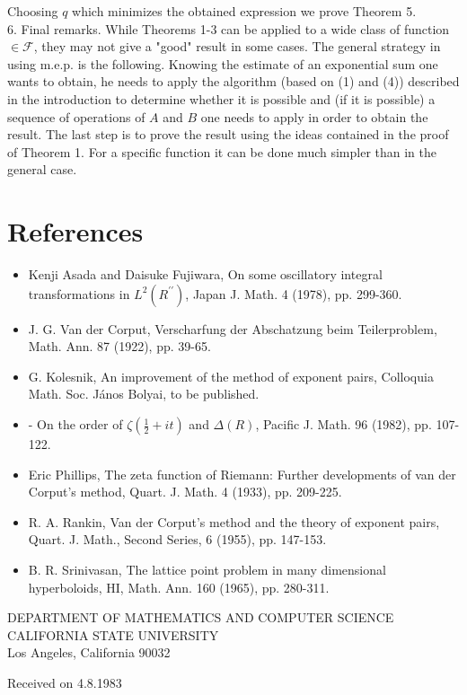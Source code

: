 \documentclass[10pt]{article}
\begin{document}
Choosing $q$ which minimizes the obtained expression we prove Theorem 5.\\
6. Final remarks. While Theorems 1-3 can be applied to a wide class of function $\in \mathscr{F}$, they may not give a "good" result in some cases. The general strategy in using m.e.p. is the following. Knowing the estimate of an exponential sum one wants to obtain, he needs to apply the algorithm (based on (1) and (4)) described in the introduction to determine whether it is possible and (if it is possible) a sequence of operations of $A$ and $B$ one needs to apply in order to obtain the result. The last step is to prove the result using the ideas contained in the proof of Theorem 1. For a specific function it can be done much simpler than in the general case.

\section*{References}
\begin{itemize}
  \item[] [1] Kenji Asada and Daisuke Fujiwara, On some oscillatory integral transformations in $L^{2}\left(R^{\prime \prime}\right)$, Japan J. Math. 4 (1978), pp. 299-360.
  \item[] [2] J. G. Van der Corput, Verscharfung der Abschatzung beim Teilerproblem, Math. Ann. 87 (1922), pp. 39-65.
  \item[] [3] G. Kolesnik, An improvement of the method of exponent pairs, Colloquia Math. Soc. János Bolyai, to be published.
  \item[] [4] - On the order of $\zeta\left(\frac{1}{2}+i t\right)$ and $\Delta(R)$, Pacific J. Math. 96 (1982), pp. 107-122.
  \item[] [5] Eric Phillips, The zeta function of Riemann: Further developments of van der Corput's method, Quart. J. Math. 4 (1933), pp. 209-225.
  \item[] [6] R. A. Rankin, Van der Corput's method and the theory of exponent pairs, Quart. J. Math., Second Series, 6 (1955), pp. 147-153.
  \item[] [7] B. R. Srinivasan, The lattice point problem in many dimensional hyperboloids, HI, Math. Ann. 160 (1965), pp. 280-311.
\end{itemize}

DEPARTMENT OF MATHEMATICS AND COMPUTER SCIENCE CALIFORNIA STATE UNIVERSITY\\
Los Angeles, California 90032

Received on 4.8.1983
\end{document}
